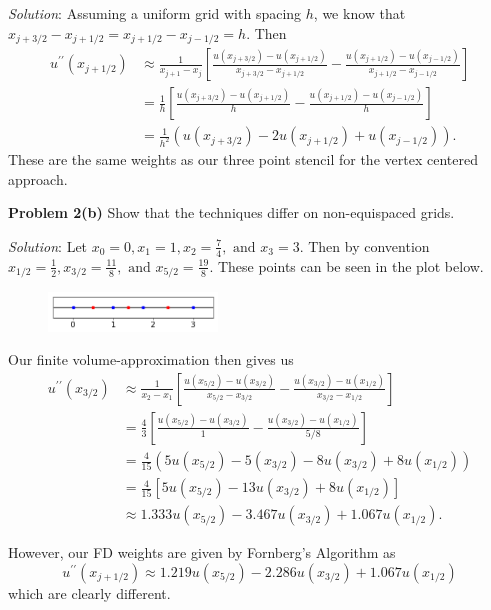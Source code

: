 \documentclass[12pt]{article}
\newcommand{\problem}[1]{\hspace{-4 ex} \large \textbf{Problem #1} }
\newcommand{\solution}{\textit{Solution}:\bigbreak}
\begin{document}
\solution
Assuming a uniform grid with spacing $h$, we know that $x_{j+3/2}-x_{j+1/2} = x_{j+1/2}-x_{j-1/2} = h$. Then
\begin{align*}
	u^{\prime\prime}(x_{j+1/2}) &\approx \frac{1}{x_{j+1} - x_j} \left[ \frac{u(x_{j+3/2}) - u(x_{j+1/2})}{x_{j+3/2} - x_{j+1/2}} - \frac{u(x_{j+1/2}) - u(x_{j-1/2})}{x_{j+1/2} - x_{j-1/2}} \right] \\
	 &= \frac{1}{h} \left[ \frac{u(x_{j+3/2}) - u(x_{j+1/2})}{h} - \frac{u(x_{j+1/2}) - u(x_{j-1/2})}{h} \right] \\
	 &= \frac{1}{h^2} \left( u(x_{j+3/2}) - 2u(x_{j+1/2}) + u(x_{j-1/2}) \right) \text{.}
\end{align*}
These are the same weights as our three point stencil for the vertex centered approach.
\bigbreak


\problem{2(b)} Show that the techniques differ on non-equispaced grids. 

\solution
Let $x_0 = 0, x_1 = 1, x_2 = \frac{7}{4}, \text{ and } x_3 = 3$.  Then by convention $x_{1/2} = \frac{1}{2}, x_{3/2} = \frac{11}{8}, \text{ and } x_{5/2} = \frac{19}{8}$. These points can be seen in the plot below.
\begin{figure}[H]
	\includegraphics[width=0.4\textwidth]{unequal_points}
	\centering
\end{figure}

Our finite volume-approximation then gives us
\begin{align*}
	u^{\prime\prime}(x_{3/2}) &\approx \frac{1}{x_{2} - x_1} \left[ \frac{u(x_{5/2}) - u(x_{3/2})}{x_{5/2} - x_{3/2}} - \frac{u(x_{3/2}) - u(x_{1/2})}{x_{3/2} - x_{1/2}} \right] \\
	&= \frac{4}{3} \left[ \frac{u(x_{5/2}) - u(x_{3/2})}{1} - \frac{u(x_{3/2}) - u(x_{1/2})}{5/8} \right] \\
	&= \frac{4}{15} \left( 5u(x_{5/2}) - 5(x_{3/2}) - 8u(x_{3/2}) + 8u(x_{1/2}) \right) \\
	&= \frac{4}{15} \left[ 5u(x_{5/2}) - 13u(x_{3/2}) + 8u(x_{1/2}) \right] \\
	&\approx 1.333u(x_{5/2}) - 3.467u(x_{3/2}) + 1.067u(x_{1/2}) \text{.}
\end{align*}

However, our FD weights are given by Fornberg's Algorithm as
$$
u^{\prime\prime}(x_{j+1/2}) \approx 1.219u(x_{5/2}) - 2.286u(x_{3/2}) + 1.067u(x_{1/2})
$$
which are clearly different.
\bigbreak
\end{document}
